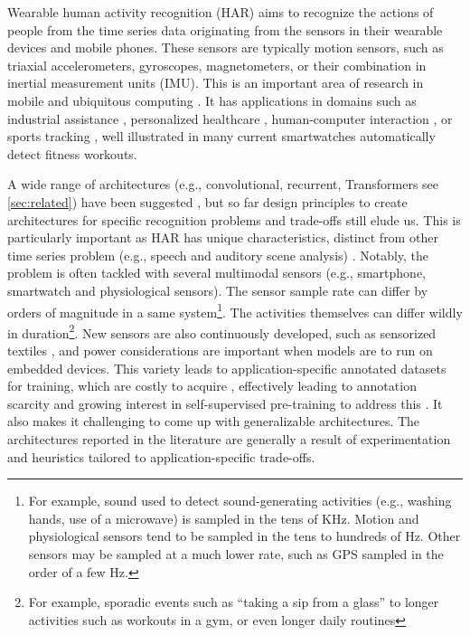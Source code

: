Wearable human activity recognition (HAR) aims to recognize the actions of people 
from the time series data originating from the sensors in their wearable devices and mobile phones. These sensors are typically motion sensors, such as triaxial accelerometers, gyroscopes, magnetometers, or their combination in inertial measurement units (IMU). 
This is an important area of research in mobile and ubiquitous computing \cite{Cook10,SanSegundo18,Ploetz18}.
It has applications in domains such as industrial assistance
\cite{Scholl15},
personalized healthcare %
\cite{Lee18}, 
human-computer interaction \cite{Luckowicz10_computer}, 
or sports tracking 
\cite{Hsu19}, well illustrated in many current smartwatches automatically detect fitness workouts. 




A wide range of architectures (e.g., convolutional, recurrent, Transformers \textemdash see \cref{sec:related}) have been suggested \cite{Chen21,Gu21}, but so far design principles to create architectures for specific recognition problems and trade-offs still elude us.
This is particularly important as HAR has unique characteristics, distinct from other time series problem (e.g., speech and auditory scene analysis) \cite{Demrozi20}. Notably, the problem is often tackled with several multimodal sensors (e.g., smartphone, smartwatch and physiological sensors). The sensor sample rate can differ by orders of magnitude in a same system\footnote{For example, sound used to detect sound-generating activities (e.g., washing hands, use of a microwave) is sampled in the tens of KHz. Motion and physiological sensors tend to be sampled in the tens to hundreds of Hz. Other sensors may be sampled at a much lower rate, such as GPS sampled in the order of a few Hz.}. The activities themselves can differ wildly in duration\footnote{For example, sporadic events such as ``taking a sip from a glass'' to longer activities such as workouts in a gym, or even longer daily routines}. New sensors are also continuously developed, such as sensorized textiles \cite{TellezVillamizar24}, and power considerations are important when models are to run on embedded devices.
This variety leads to application-specific annotated datasets for training, which are costly to acquire \cite{Welbourne14}, effectively leading to annotation scarcity \cite{Chen21} and growing interest in self-supervised pre-training to address this \cite{SSLHARsurvey}. 
It also makes it challenging to come up with generalizable architectures.
The architectures reported in the literature are generally a result of experimentation and heuristics tailored to application-specific trade-offs.


